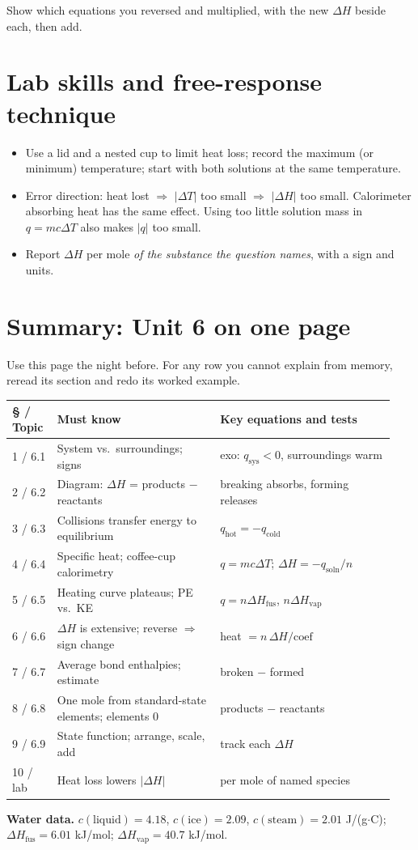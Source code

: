 \documentclass[11pt]{article}
\begin{document}
\frph Show which equations you reversed and multiplied, with the new $\Delta H$ beside each, then add.

\section{Lab skills and free-response technique}\label{t:lab}
\begin{itemize}
\item Use a lid and a nested cup to limit heat loss; record the maximum (or minimum) temperature; start with both solutions at the same temperature.
\item Error direction: heat lost $\Rightarrow$ $|\Delta T|$ too small $\Rightarrow$ $|\Delta H|$ too small. Calorimeter absorbing heat has the same effect. Using too little solution mass in $q = mc\Delta T$ also makes $|q|$ too small.
\item Report $\Delta H$ per mole \emph{of the substance the question names}, with a sign and units.
\end{itemize}

\clearpage
\section*{Summary: Unit 6 on one page}
Use this page the night before. For any row you cannot explain from memory, reread its section and redo its worked example.

\begin{longtable}{@{}p{0.11\linewidth}p{0.40\linewidth}p{0.43\linewidth}@{}}\toprule
\S{} / Topic & Must know & Key equations and tests \\ \midrule
1 / 6.1 & System vs.\ surroundings; signs & exo: $q_{\text{sys}} < 0$, surroundings warm \\[3pt]
2 / 6.2 & Diagram: $\Delta H$ = products $-$ reactants & breaking absorbs, forming releases \\[3pt]
3 / 6.3 & Collisions transfer energy to equilibrium & $q_{\text{hot}} = -q_{\text{cold}}$ \\[3pt]
4 / 6.4 & Specific heat; coffee-cup calorimetry & $q = mc\Delta T$; $\Delta H = -q_{\text{soln}}/n$ \\[3pt]
5 / 6.5 & Heating curve plateaus; PE vs.\ KE & $q = n\Delta H_{\text{fus}}$, $n\Delta H_{\text{vap}}$ \\[3pt]
6 / 6.6 & $\Delta H$ is extensive; reverse $\Rightarrow$ sign change & heat $= n\,\Delta H/\text{coef}$ \\[3pt]
7 / 6.7 & Average bond enthalpies; estimate & broken $-$ formed \\[3pt]
8 / 6.8 & One mole from standard-state elements; elements 0 & products $-$ reactants \\[3pt]
9 / 6.9 & State function; arrange, scale, add & track each $\Delta H$ \\[3pt]
10 / lab & Heat loss lowers $|\Delta H|$ & per mole of named species \\ \bottomrule
\end{longtable}

\textbf{Water data.} $c(\text{liquid}) = 4.18$, $c(\text{ice}) = 2.09$, $c(\text{steam}) = 2.01$ J/(g$\cdot$\textdegree C); $\Delta H_{\text{fus}} = 6.01$ kJ/mol; $\Delta H_{\text{vap}} = 40.7$ kJ/mol.
\end{document}
